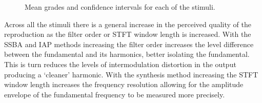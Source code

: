 \begin{figure}[h!]
		\quad
		\caption{Mean grades and confidence intervals for each of the stimuli.}
		\label{fig:SMCResults}
	\end{figure}

	Across all the stimuli there is a general increase in the perceived quality of the reproduction as the filter order
	or STFT window length is increased. With the SSBA and IAP methods increasing the filter order increases the level
	difference between the fundamental and its harmonics, better isolating the fundamental.  This is turn reduces the
	levels of intermodulation distortion in the output producing a `cleaner' harmonic.  With the synthesis method
	increasing the STFT window length increases the frequency resolution allowing for the amplitude envelope of the
	fundamental frequency to be measured more precisely.

